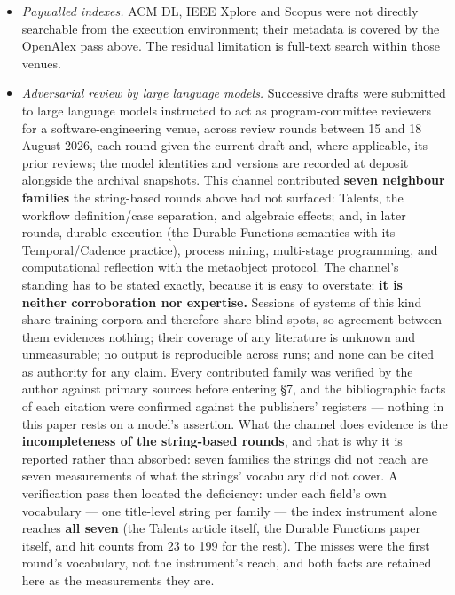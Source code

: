 \documentclass[
]{article}
\newcounter{none} %
\begin{document}
\begin{itemize}
  literature, the Actors model, macro-operators) plus one family
  screened out here: deterministic record-and-replay for debugging,
  which records one execution's nondeterminism so that run can be
  reproduced --- an account of a single run, with no definition, no
  reuse, and no subject owning the record. \textbf{arXiv}, three phrase
  strings --- 0 entries each. No candidate holding the conjunction
  surfaced in any row.
\item
  \emph{Paywalled indexes.} ACM DL, IEEE Xplore and Scopus were not
  directly searchable from the execution environment; their metadata is
  covered by the OpenAlex pass above. The residual limitation is
  full-text search within those venues.
\item
  \emph{Adversarial review by large language models.} Successive drafts
  were submitted to large language models instructed to act as
  program-committee reviewers for a software-engineering venue, across
  review rounds between 15 and 18 August 2026, each round given the
  current draft and, where applicable, its prior reviews; the model
  identities and versions are recorded at deposit alongside the archival
  snapshots. This channel contributed \textbf{seven neighbour families}
  the string-based rounds above had not surfaced: Talents, the workflow
  definition/case separation, and algebraic effects; and, in later
  rounds, durable execution (the Durable Functions semantics with its
  Temporal/Cadence practice), process mining, multi-stage programming,
  and computational reflection with the metaobject protocol. The
  channel's standing has to be stated exactly, because it is easy to
  overstate: \textbf{it is neither corroboration nor expertise.}
  Sessions of systems of this kind share training corpora and therefore
  share blind spots, so agreement between them evidences nothing; their
  coverage of any literature is unknown and unmeasurable; no output is
  reproducible across runs; and none can be cited as authority for any
  claim. Every contributed family was verified by the author against
  primary sources before entering §7, and the bibliographic facts of
  each citation were confirmed against the publishers' registers ---
  nothing in this paper rests on a model's assertion. What the channel
  does evidence is the \textbf{incompleteness of the string-based
  rounds}, and that is why it is reported rather than absorbed: seven
  families the strings did not reach are seven measurements of what the
  strings' vocabulary did not cover. A verification pass then located
  the deficiency: under each field's own vocabulary --- one title-level
  string per family --- the index instrument alone reaches \textbf{all
  seven} (the Talents article itself, the Durable Functions paper
  itself, and hit counts from 23 to 199 for the rest). The misses were
  the first round's vocabulary, not the instrument's reach, and both
  facts are retained here as the measurements they are.
\end{itemize}
\end{document}
